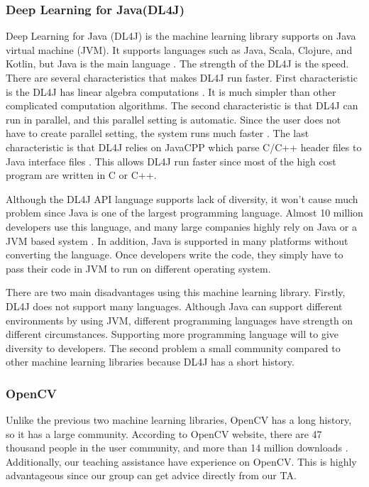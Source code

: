 \documentclass[onecolumn, draftclsnofoot,10pt, compsoc]{IEEEtran}
\begin{document}
\subsubsection{Deep Learning for Java(DL4J)}
Deep Learning for Java (DL4J) is the machine learning library supports on Java virtual machine (JVM). It supports languages such as Java, Scala, Clojure, and Kotlin, but Java is the main language \cite{DL}. The strength of the DL4J is the speed. There are several characteristics that makes DL4J run faster. First characteristic is the DL4J has linear algebra computations \cite{DL}. It is much simpler than other complicated computation algorithms. The second characteristic is that DL4J can run in parallel, and this parallel setting is automatic. Since the user does not have to create parallel setting, the system runs much faster \cite{DL}. The last characteristic is that DL4J relies on JavaCPP which parse C/C++ header files to Java interface files \cite{DL}. This allows DL4J run faster since most of the high cost program are written in C or C++.

Although the DL4J API language supports lack of diversity, it won\rq t cause much problem since Java is one of the largest programming language. Almost 10 million developers use this language, and many large companies highly rely on Java or a JVM based system \cite{DL}. In addition, Java is supported in many platforms without converting the language. Once developers write the code, they simply have to pass their code in JVM to run on different operating system.

There are two main disadvantages using this machine learning library. Firstly, DL4J does not support many languages. Although Java can support different environments by using JVM, different programming languages have strength on different circumstances. Supporting more programming language will to give diversity to developers. The second problem a small community compared to other machine learning libraries because DL4J has a short history.

\subsubsection{OpenCV}
Unlike the previous two machine learning libraries, OpenCV has a long history, so it has a large community. According to OpenCV website, there are 47 thousand people in the user community, and more than 14 million downloads \cite{OCV}. Additionally, our teaching assistance have experience on OpenCV. This is highly advantageous since our group can get advice directly from our TA.
\end{document}
